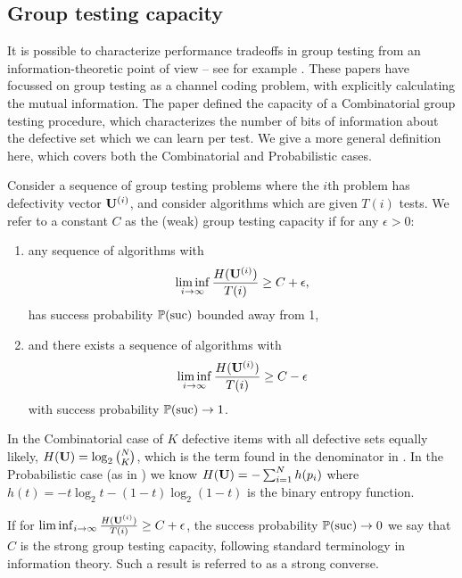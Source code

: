 \subsection{Group testing capacity}
%
It is possible to characterize performance tradeoffs in group testing 
 from an information-theoretic point of view -- see for example \cite{atia, johnsonc10, johnson33, tan}. These papers have focussed on group testing as a channel coding problem, 
with \cite{atia, tan}
explicitly calculating the mutual information.
The paper \cite{johnsonc10} defined the capacity of a Combinatorial group testing procedure, which characterizes the number of bits of information
about the defective set which we can learn per test. We give a more general definition here,
which covers both the Combinatorial and Probabilistic cases.
%
\begin{definition} \label{def:capacity} Consider a sequence of group testing problems where the $i$th problem
has defectivity vector  ${\mathbf{ U}}^{(i)}$, and consider algorithms which are given $T(i)$ tests.
We refer to a constant $C$ as the (weak) group testing capacity if for any $\epsilon > 0$:
  \begin{enumerate}
    \item any sequence of algorithms with
      \begin{equation} \label{eq:lower}
        \liminf_{i \rightarrow \infty} \frac{ H({\mathbf{ U}}^{(i)}) }{T(i)} \geq C+ \epsilon,
      \end{equation}
      has success probability ${\mathbb{P}}(\textrm{suc})$ bounded away from 1,
    \item and there exists a sequence of algorithms with
      \begin{equation} \label{eq:upper}
        \liminf_{i \rightarrow \infty} \frac{H({\mathbf{ U}}^{(i)}) }{T(i)}  \geq C - \epsilon
      \end{equation}
      with success probability ${\mathbb{P}}({\mathrm{suc}}) \rightarrow 1$.
  \end{enumerate}
\end{definition}
%
\begin{remark}
In the Combinatorial case of $K$ defective items with all defective sets equally
likely, $ H({\mathbf{ U}}) = \log_2 \binom{N}{K}$, which is the term found in the denominator in \cite[Eq. (1) and (2)]{johnsonc10}. In the Probabilistic case (as in \cite{li5}) 
 we know $H({\mathbf{ U}}) = -\sum_{i=1}^N h(p_i)$ where $h(t) = -t \log_2 t - (1-t) \log_2(1-t)$ is the binary entropy function. 
\end{remark}
%
\begin{remark} If for $ \liminf_{i \rightarrow \infty} \frac{ H({\mathbf{ U}}^{(i)}) }{T(i)} \geq C+ \epsilon$, the success probability 
${\mathbb{P}}({\mathrm{suc}}) \rightarrow 0$ we say that $C$ is the strong group testing capacity, following standard terminology in information
theory. Such a result is referred to as a strong converse.
\end{remark}

